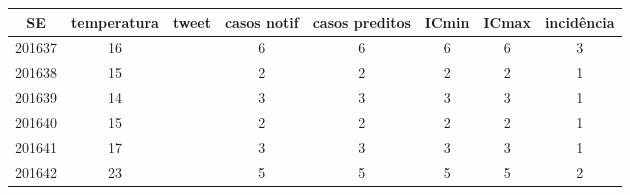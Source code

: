 \begin{tabular}{c|ccccccc}
  \hline
SE & temperatura & tweet & casos notif & casos preditos & ICmin & ICmax & incidência \\ 
  \hline
201637 & 16 &  & 6 & 6 & 6 & 6 & 3 \\ 
  201638 & 15 &  & 2 & 2 & 2 & 2 & 1 \\ 
  201639 & 14 &  & 3 & 3 & 3 & 3 & 1 \\ 
  201640 & 15 &  & 2 & 2 & 2 & 2 & 1 \\ 
  201641 & 17 &  & 3 & 3 & 3 & 3 & 1 \\ 
  201642 & 23 &  & 5 & 5 & 5 & 5 & 2 \\ 
   \hline
\end{tabular}
